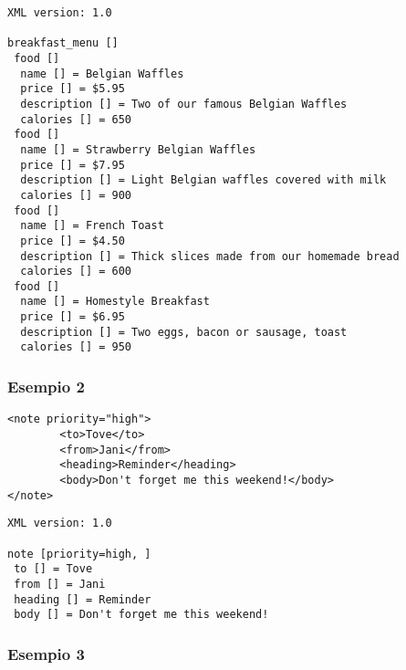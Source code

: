 \documentclass[italian,a4paper]{article}
\begin{document}
\begin{mdframed}[frametitle=Output]
\begin{verbatim}
XML version: 1.0

breakfast_menu []
 food []
  name [] = Belgian Waffles
  price [] = $5.95
  description [] = Two of our famous Belgian Waffles
  calories [] = 650
 food []
  name [] = Strawberry Belgian Waffles
  price [] = $7.95
  description [] = Light Belgian waffles covered with milk
  calories [] = 900
 food []
  name [] = French Toast
  price [] = $4.50
  description [] = Thick slices made from our homemade bread
  calories [] = 600
 food []
  name [] = Homestyle Breakfast
  price [] = $6.95
  description [] = Two eggs, bacon or sausage, toast
  calories [] = 950
\end{verbatim}
\end{mdframed}

\subsubsection{Esempio 2}

\begin{mdframed}[frametitle=Input]
\begin{verbatim}
<note priority="high">
        <to>Tove</to>
        <from>Jani</from>
        <heading>Reminder</heading>
        <body>Don't forget me this weekend!</body>
</note>
\end{verbatim}
\end{mdframed}

\begin{mdframed}[frametitle=Output]
\begin{verbatim}
XML version: 1.0

note [priority=high, ]
 to [] = Tove
 from [] = Jani
 heading [] = Reminder
 body [] = Don't forget me this weekend!
\end{verbatim}
\end{mdframed}

\subsubsection{Esempio 3}
\end{document}
